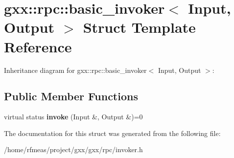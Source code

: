 \hypertarget{structgxx_1_1rpc_1_1basic__invoker}{}\section{gxx\+:\+:rpc\+:\+:basic\+\_\+invoker$<$ Input, Output $>$ Struct Template Reference}
\label{structgxx_1_1rpc_1_1basic__invoker}


Inheritance diagram for gxx\+:\+:rpc\+:\+:basic\+\_\+invoker$<$ Input, Output $>$\+:
\subsection*{Public Member Functions}
\begin{DoxyCompactItemize}
\item 
virtual status {\bfseries invoke} (Input \&, Output \&)=0\hypertarget{structgxx_1_1rpc_1_1basic__invoker_a2e5f0f0570a895e7c367384a6ccd67e3}{}\label{structgxx_1_1rpc_1_1basic__invoker_a2e5f0f0570a895e7c367384a6ccd67e3}

\end{DoxyCompactItemize}


The documentation for this struct was generated from the following file\+:\begin{DoxyCompactItemize}
\item 
/home/rfmeas/project/gxx/gxx/rpc/invoker.\+h\end{DoxyCompactItemize}
